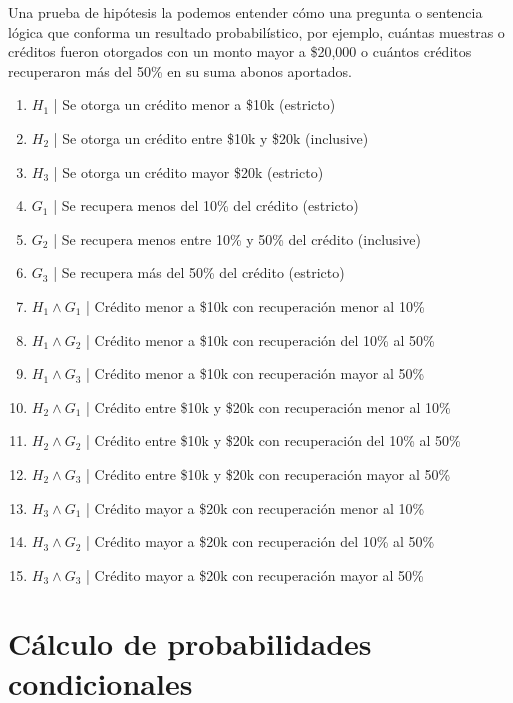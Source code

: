 \documentclass{article}
\begin{document}
Una prueba de hipótesis la podemos entender cómo una pregunta o sentencia lógica que conforma un resultado probabilístico, por ejemplo, cuántas muestras o créditos fueron otorgados con un monto mayor a \$20,000 o cuántos créditos recuperaron más del 50\% en su suma abonos aportados.
\begin{enumerate}
    \item $H_1$ | Se otorga un crédito menor a \$10k (estricto)
    \item $H_2$ | Se otorga un crédito entre \$10k y \$20k (inclusive)
    \item $H_3$ | Se otorga un crédito mayor \$20k (estricto)
    \item $G_1$ | Se recupera menos del 10\% del crédito (estricto)
    \item $G_2$ | Se recupera menos entre 10\% y 50\% del crédito (inclusive)
    \item $G_3$ | Se recupera más del 50\% del crédito (estricto)
    \item $H_1 \land G_1$ | Crédito menor a \$10k con recuperación menor al 10\%
    \item $H_1 \land G_2$ | Crédito menor a \$10k con recuperación del 10\% al 50\%
    \item $H_1 \land G_3$ | Crédito menor a \$10k con recuperación mayor al 50\%
    \item $H_2 \land G_1$ | Crédito entre \$10k y \$20k con recuperación menor al 10\%
    \item $H_2 \land G_2$ | Crédito entre \$10k y \$20k con recuperación del 10\% al 50\%
    \item $H_2 \land G_3$ | Crédito entre \$10k y \$20k con recuperación mayor al 50\%
    \item $H_3 \land G_1$ | Crédito mayor a \$20k con recuperación menor al 10\%
    \item $H_3 \land G_2$ | Crédito mayor a \$20k con recuperación del 10\% al 50\%
    \item $H_3 \land G_3$ | Crédito mayor a \$20k con recuperación mayor al 50\%
\end{enumerate}

\section{Cálculo de probabilidades condicionales}
\end{document}
